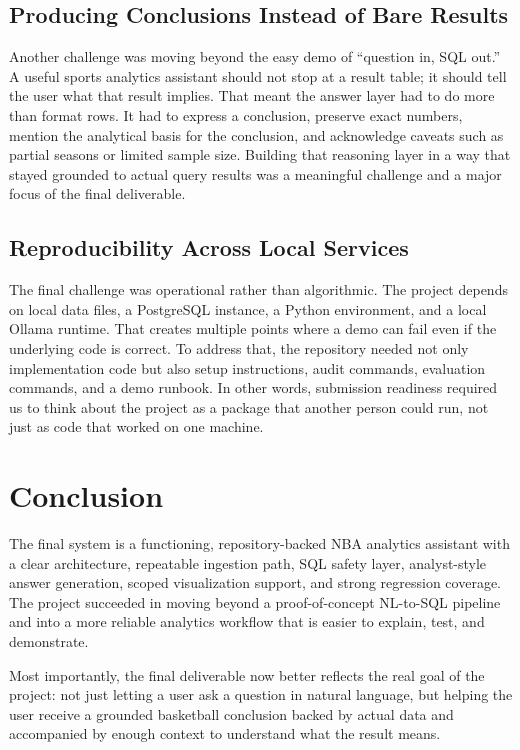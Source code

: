 \documentclass[11pt]{article}
\begin{document}
\subsection{Producing Conclusions Instead of Bare Results}
Another challenge was moving beyond the easy demo of ``question in, SQL out.'' A useful sports analytics assistant should not stop at a result table; it should tell the user what that result implies. That meant the answer layer had to do more than format rows. It had to express a conclusion, preserve exact numbers, mention the analytical basis for the conclusion, and acknowledge caveats such as partial seasons or limited sample size. Building that reasoning layer in a way that stayed grounded to actual query results was a meaningful challenge and a major focus of the final deliverable.

\subsection{Reproducibility Across Local Services}
The final challenge was operational rather than algorithmic. The project depends on local data files, a PostgreSQL instance, a Python environment, and a local Ollama runtime. That creates multiple points where a demo can fail even if the underlying code is correct. To address that, the repository needed not only implementation code but also setup instructions, audit commands, evaluation commands, and a demo runbook. In other words, submission readiness required us to think about the project as a package that another person could run, not just as code that worked on one machine.

\section{Conclusion}
The final system is a functioning, repository-backed NBA analytics assistant with a clear architecture, repeatable ingestion path, SQL safety layer, analyst-style answer generation, scoped visualization support, and strong regression coverage. The project succeeded in moving beyond a proof-of-concept NL-to-SQL pipeline and into a more reliable analytics workflow that is easier to explain, test, and demonstrate.

Most importantly, the final deliverable now better reflects the real goal of the project: not just letting a user ask a question in natural language, but helping the user receive a grounded basketball conclusion backed by actual data and accompanied by enough context to understand what the result means.
\end{document}
